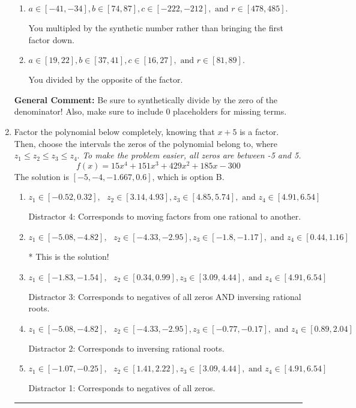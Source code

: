 \documentclass{extbook}[14pt]
\newcommand{\litem}[1]{\item #1

\rule{\textwidth}{0.4pt}}
\begin{document}
\begin{enumerate}
{\begin{enumerate}[label=\Alph*.]
 You divided by the opposite of the factor AND multipled the first factor rather than just bringing it down.
\item \( a \in [-41, -34], b \in [74, 87], c \in [-222, -212], \text{ and } r \in [478, 485]. \)

 You multipled by the synthetic number rather than bringing the first factor down.
\item \( a \in [19, 22], b \in [37, 41], c \in [16, 27], \text{ and } r \in [81, 89]. \)

 You divided by the opposite of the factor.
\end{enumerate}

\textbf{General Comment:} Be sure to synthetically divide by the zero of the denominator! Also, make sure to include 0 placeholders for missing terms.
}
\litem{
Factor the polynomial below completely, knowing that $x + 5$ is a factor. Then, choose the intervals the zeros of the polynomial belong to, where $z_1 \leq z_2 \leq z_3 \leq z_4$. \textit{To make the problem easier, all zeros are between -5 and 5.}
\[ f(x) = 15x^{4} +151 x^{3} +429 x^{2} +185 x -300 \]The solution is \( [-5, -4, -1.667, 0.6] \), which is option B.\begin{enumerate}[label=\Alph*.]
\item \( z_1 \in [-0.52, 0.32], \text{   }  z_2 \in [3.14, 4.93], z_3 \in [4.85, 5.74], \text{   and   } z_4 \in [4.91, 6.54] \)

 Distractor 4: Corresponds to moving factors from one rational to another.
\item \( z_1 \in [-5.08, -4.82], \text{   }  z_2 \in [-4.33, -2.95], z_3 \in [-1.8, -1.17], \text{   and   } z_4 \in [0.44, 1.16] \)

* This is the solution!
\item \( z_1 \in [-1.83, -1.54], \text{   }  z_2 \in [0.34, 0.99], z_3 \in [3.09, 4.44], \text{   and   } z_4 \in [4.91, 6.54] \)

 Distractor 3: Corresponds to negatives of all zeros AND inversing rational roots.
\item \( z_1 \in [-5.08, -4.82], \text{   }  z_2 \in [-4.33, -2.95], z_3 \in [-0.77, -0.17], \text{   and   } z_4 \in [0.89, 2.04] \)

 Distractor 2: Corresponds to inversing rational roots.
\item \( z_1 \in [-1.07, -0.25], \text{   }  z_2 \in [1.41, 2.22], z_3 \in [3.09, 4.44], \text{   and   } z_4 \in [4.91, 6.54] \)

 Distractor 1: Corresponds to negatives of all zeros.
\end{enumerate}

}
\end{enumerate}
\end{document}
